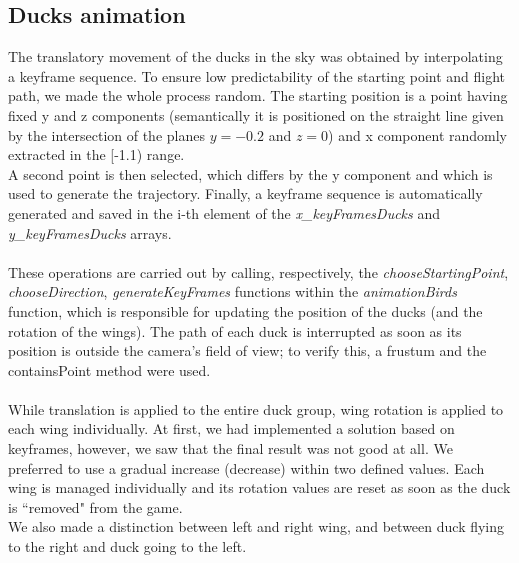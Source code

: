 \documentclass[12pt,a4paper]{article}
\begin{document}
\subsection{Ducks animation}
The translatory movement of the ducks in the sky was obtained by interpolating a keyframe sequence. To ensure low predictability of the starting point and flight path, we made the whole process random.
The starting position is a point having fixed y and z components (semantically it is positioned on the straight line given by the intersection of the planes $y=-0.2$ and $z=0	$) and x component randomly extracted in the [-1.1) range.\\
A second point is then selected, which differs by the y component and which is used to generate the trajectory. Finally, a keyframe sequence is automatically generated and saved in the i-th element of the \textit{x\_keyFramesDucks} and \textit{y\_keyFramesDucks} arrays.\\\\
These operations are carried out by calling, respectively, the \textit{chooseStartingPoint}, \textit{chooseDirection}, \textit{generateKeyFrames} functions within the \textit{animationBirds} function, which is responsible for updating the position of the ducks (and the rotation of the wings). The path of each duck is interrupted as soon as its position is outside the camera's field of view; to verify this, a frustum and the containsPoint method were used.\\\\
While translation is applied to the entire duck group, wing rotation is applied to each wing individually. At first, we had implemented a solution based on keyframes, however, we saw that the final result was not good at all.
We preferred to use a gradual increase (decrease) within two defined values. Each wing is managed individually and its rotation values are reset as soon as the duck is ``removed" from the game.\\
We also made a distinction between left and right wing, and between duck flying to the right and duck going to the left.
\end{document}
